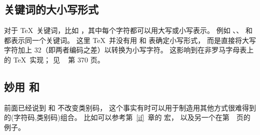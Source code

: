 \documentclass{book}
\begin{document}
\subsection{关键词的大小写形式}

对于 \TeX\ 关键词，比如 ，其中每个字符都可以用大写或小写表示。
例如  、、 和  都表示同一个关键词。
这里 \TeX\ 并没有用  和  表确定小写形式，
而是直接将大写字符加上 32（即两者编码之差）以转换为小写字符。
这影响到在非罗马字母表上的 \TeX\ 实现；
见 \TeXbook\ \cite{Knuth:TeXbook} 第 370 页。

\subsection{妙用  和 }

前面已经说到  和  不改变类别码，
这个事实有时可以用于制造用其他方式很难得到的(字符码,类别码)组合。
比如可以参考第~\ref{if}~章的  宏，
以及另一个在第~\pageref{spsb:truc}~页的例子。
\end{document}
